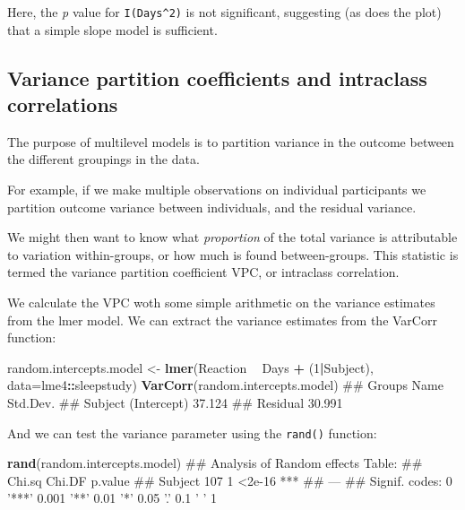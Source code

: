 \documentclass[]{article}
\newenvironment{Shaded}{\begin{snugshade}}{\end{snugshade}}
\newcommand{\KeywordTok}[1]{\textcolor[rgb]{0.13,0.29,0.53}{\textbf{#1}}}
\newcommand{\DataTypeTok}[1]{\textcolor[rgb]{0.13,0.29,0.53}{#1}}
\newcommand{\DecValTok}[1]{\textcolor[rgb]{0.00,0.00,0.81}{#1}}
\newcommand{\StringTok}[1]{\textcolor[rgb]{0.31,0.60,0.02}{#1}}
\newcommand{\OperatorTok}[1]{\textcolor[rgb]{0.81,0.36,0.00}{\textbf{#1}}}
\newcommand{\NormalTok}[1]{#1}
\theoremstyle{definition}
\theoremstyle{definition}
\theoremstyle{definition}
\theoremstyle{remark}
\begin{document}
Here, the \emph{p} value for \texttt{I(Days\^{}2)} is not significant,
suggesting (as does the plot) that a simple slope model is sufficient.

\hypertarget{icc-and-vpc}{\subsection*{Variance partition coefficients
and intraclass correlations}\label{icc-and-vpc}}

The purpose of multilevel models is to partition variance in the outcome
between the different groupings in the data.

For example, if we make multiple observations on individual participants
we partition outcome variance between individuals, and the residual
variance.

We might then want to know what \emph{proportion} of the total variance
is attributable to variation within-groups, or how much is found
between-groups. This statistic is termed the variance partition
coefficient VPC, or intraclass correlation.

We calculate the VPC woth some simple arithmetic on the variance
estimates from the lmer model. We can extract the variance estimates
from the VarCorr function:

\begin{Shaded}
\begin{Highlighting}[]
\NormalTok{random.intercepts.model <-}\StringTok{ }\KeywordTok{lmer}\NormalTok{(Reaction }\OperatorTok{~}\StringTok{ }\NormalTok{Days }\OperatorTok{+}\StringTok{ }\NormalTok{(}\DecValTok{1}\OperatorTok{|}\NormalTok{Subject),  }\DataTypeTok{data=}\NormalTok{lme4}\OperatorTok{::}\NormalTok{sleepstudy)}
\KeywordTok{VarCorr}\NormalTok{(random.intercepts.model)}
\NormalTok{##  Groups   Name        Std.Dev.}
\NormalTok{##  Subject  (Intercept) 37.124  }
\NormalTok{##  Residual             30.991}
\end{Highlighting}
\end{Shaded}

And we can test the variance parameter using the \texttt{rand()}
function:

\begin{Shaded}
\begin{Highlighting}[]
\KeywordTok{rand}\NormalTok{(random.intercepts.model)}
\NormalTok{## Analysis of Random effects Table:}
\NormalTok{##         Chi.sq Chi.DF p.value    }
\NormalTok{## Subject    107      1  <2e-16 ***}
\NormalTok{## ---}
\NormalTok{## Signif. codes:  0 '***' 0.001 '**' 0.01 '*' 0.05 '.' 0.1 ' ' 1}
\end{Highlighting}
\end{Shaded}
\end{document}
